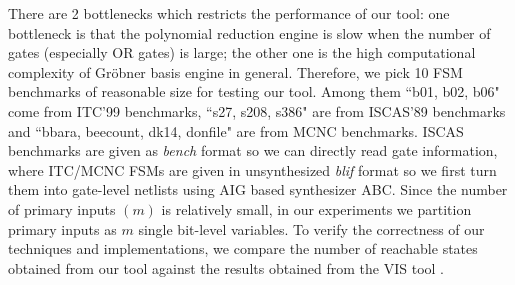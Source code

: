 There are 2 bottlenecks which restricts the performance of our tool:
one bottleneck is that the polynomial reduction engine is slow when the number of
gates (especially OR gates) is large; the other one is the high computational complexity
of Gr\"obner basis engine in general. Therefore, we pick 10 FSM
benchmarks of reasonable size for testing our tool. Among them ``b01,
b02, b06" come from ITC'99 benchmarks, %
``s27, s208, s386" are from  ISCAS'89 benchmarks %
 and ``bbara, beecount, dk14, donfile" are from MCNC benchmarks. %
ISCAS benchmarks are given as {\it bench} format so we can directly read gate information,
where ITC/MCNC FSMs are given in unsynthesized {\it blif} format so we first turn them
into gate-level netlists using AIG based synthesizer ABC. %
Since the number of primary inputs $(m)$ is relatively small, in our experiments we partition
primary inputs as $m$ single bit-level variables. To verify the
correctness of our techniques and implementations, we compare the
number of reachable states obtained from our tool against the results
obtained from the VIS tool \cite{brayton1996vis}. 

